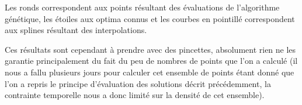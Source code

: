 Les ronds correspondent aux points résultant des évaluations de l'algorithme génétique, les étoiles aux optima connus et les courbes en pointillé correspondent aux splines résultant des interpolations.

Ces résultats sont cependant à prendre avec des pincettes, absolument rien ne les garantie principalement du fait du peu de nombres de points que l'on a calculé (il nous a fallu plusieurs jours pour calculer cet ensemble de points étant donné que l'on a repris le principe d'évaluation des solutions décrit précédemment, la contrainte temporelle nous a donc limité sur la densité de cet ensemble).

\newpage